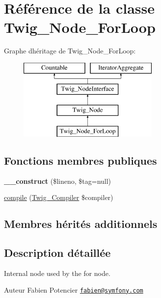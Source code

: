 \hypertarget{class_twig___node___for_loop}{}\section{Référence de la classe Twig\+\_\+\+Node\+\_\+\+For\+Loop}
\label{class_twig___node___for_loop}
Graphe d\textquotesingle{}héritage de Twig\+\_\+\+Node\+\_\+\+For\+Loop\+:\begin{figure}[H]
\begin{center}
\leavevmode
\includegraphics[height=4.000000cm]{class_twig___node___for_loop}
\end{center}
\end{figure}
\subsection*{Fonctions membres publiques}
\begin{DoxyCompactItemize}
\item 
{\bfseries \+\_\+\+\_\+construct} (\$lineno, \$tag=null)\hypertarget{class_twig___node___for_loop_a46387baf8018bb8e515955aa8304332b}{}\label{class_twig___node___for_loop_a46387baf8018bb8e515955aa8304332b}

\item 
\hyperlink{class_twig___node___for_loop_a4e0faa87c3fae583620b84d3607085da}{compile} (\hyperlink{class_twig___compiler}{Twig\+\_\+\+Compiler} \$compiler)
\end{DoxyCompactItemize}
\subsection*{Membres hérités additionnels}


\subsection{Description détaillée}
Internal node used by the for node.

\begin{DoxyAuthor}{Auteur}
Fabien Potencier \href{mailto:fabien@symfony.com}{\tt fabien@symfony.\+com} 
\end{DoxyAuthor}


